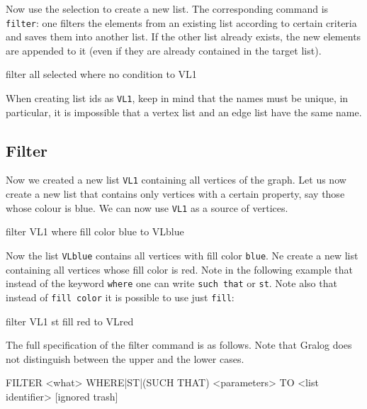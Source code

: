 Now use the selection to create a new list. The corresponding command
is \texttt{filter}: one filters the elements from an existing list
according to certain criteria and saves them into another list. If the
other list already exists, the new elements are appended to it (even
if they are already contained in the target list). 
\\\begin{tcolorbox}
  filter all selected where no condition to VL1
\end{tcolorbox}

When creating list ids as \texttt{VL1}, keep in mind that the names
must be unique, in particular, it is impossible that a vertex list and
an edge list have the same name.

\subsection{Filter}

Now we created a new list \texttt{VL1} containing all vertices of the
graph. Let us now create a new list that contains only vertices with a
certain property, say those whose colour is blue. We can now use
\texttt{VL1} as a source of vertices.
\\\begin{tcolorbox}
  filter VL1 where fill color blue to VLblue
\end{tcolorbox}

Now the list \texttt{VLblue} contains all vertices with fill color
\texttt{blue}. Ne create a new list containing all vertices whose fill
color is red. Note in the following example that instead of the
keyword \texttt{where} one can write \texttt{such that} or
\texttt{st}. Note also that instead of \texttt{fill color} it is
possible to use just \texttt{fill}:
\\\begin{tcolorbox}
  filter VL1 st fill red to VLred
\end{tcolorbox}

The full specification of the filter command is as follows. Note that
Gralog does not distinguish between the upper and the lower cases.
\\\begin{tcolorbox}[colback=lightpink]
  FILTER <what> WHERE|ST|(SUCH THAT) <parameters> TO <list identifier>
  [ignored trash]
\end{tcolorbox}
 
